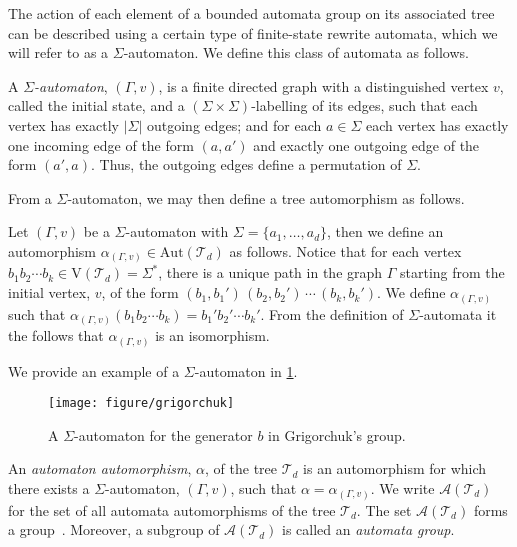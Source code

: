 The action of each element of a bounded automata group on its associated tree can be described using a certain type of finite-state rewrite automata, which we will refer to as a $\Sigma$-automaton.
We define this class of automata as follows.

\begin{definition}\label{defn:sigma-autom}
A \emph{$\Sigma$-automaton}, $(\Gamma,v)$, is a finite directed graph with a distinguished vertex $v$, called the initial state, and a $(\Sigma\times\Sigma)$-labelling of its edges, such that each vertex has exactly $\left\vert\Sigma\right\vert$ outgoing edges; and for each $a \in \Sigma$ each vertex has exactly one incoming edge of the form $(a,a')$ and exactly one outgoing edge of the form $(a',a)$.
Thus, the outgoing edges define a permutation of $\Sigma$.
\end{definition}

From a $\Sigma$-automaton, we may then define a tree automorphism as follows.

\begin{definition}\label{defn:automata-automorphism}
Let $(\Gamma,v)$ be a $\Sigma$-automaton with $\Sigma = \{a_1,\ldots,a_d\}$, then we define an automorphism $\alpha_{(\Gamma,v)} \in \mathrm{Aut}(\mathcal{T}_d)$ as follows.
Notice that for each vertex $b_1 b_2 \cdots b_k \in \mathrm{V}\!\left(\mathcal{T}_d\right) = \Sigma^*$, there is a unique path in the graph $\Gamma$ starting from the initial vertex, $v$, of the form
$
	(b_1, b_1')
	\,
	(b_2, b_2')
	\,
	\cdots
	\,
	(b_k, b_k')
$.
We define $\alpha_{(\Gamma,v)}$ such that $\alpha_{(\Gamma,v)} (b_1 b_2 \cdots b_k) = b_1' b_2' \cdots b_k'$.
From the definition of $\Sigma$-automata it the follows that $\alpha_{(\Gamma,v)}$ is an isomorphism.
\end{definition}

We provide an example of a $\Sigma$-automaton in \cref{fig:sigma_autom_grigorchuk}.

\begin{figure}[!ht]
	\centering
	\texttt{[image: figure/grigorchuk]}
	\caption{A $\Sigma$-automaton for the generator $b$ in Grigorchuk's group.}
	\label{fig:sigma_autom_grigorchuk}
\end{figure}

An \emph{automaton automorphism}, $\alpha$, of the tree $\mathcal{T}_d$ is an automorphism for which there exists a $\Sigma$-automaton, $(\Gamma,v)$, such that $\alpha = \alpha_{(\Gamma,v)}$.
We write $\mathcal{A}\!\left(\mathcal{T}_d\right)$ for the set of all automata automorphisms of the tree $\mathcal{T}_d$.
The set $\mathcal{A}\!\left(\mathcal{T}_d\right)$ forms a group~\cite[Proposition~1]{sidki2000}.
Moreover, a subgroup of $\mathcal{A}(\mathcal{T}_d)$ is called an \emph{automata group}.

